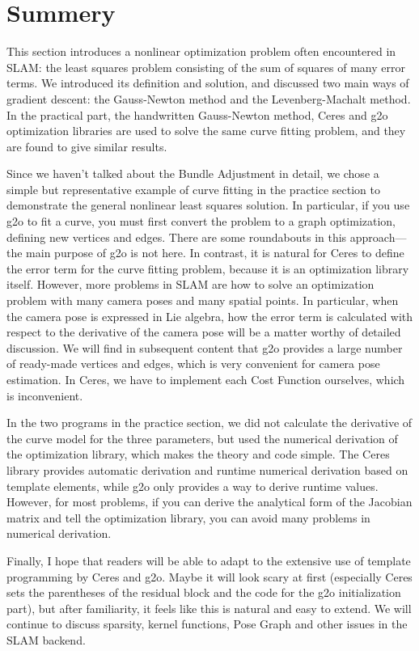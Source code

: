 \section{Summery}

This section introduces a nonlinear optimization problem often encountered in SLAM: the least squares problem consisting of the sum of squares of many error terms. We introduced its definition and solution, and discussed two main ways of gradient descent: the Gauss-Newton method and the Levenberg-Machalt method. In the practical part, the handwritten Gauss-Newton method, Ceres and g2o optimization libraries are used to solve the same curve fitting problem, and they are found to give similar results.

Since we haven't talked about the Bundle Adjustment in detail, we chose a simple but representative example of curve fitting in the practice section to demonstrate the general nonlinear least squares solution. In particular, if you use g2o to fit a curve, you must first convert the problem to a graph optimization, defining new vertices and edges. There are some roundabouts in this approach—the main purpose of g2o is not here. In contrast, it is natural for Ceres to define the error term for the curve fitting problem, because it is an optimization library itself. However, more problems in SLAM are how to solve an optimization problem with many camera poses and many spatial points. In particular, when the camera pose is expressed in Lie algebra, how the error term is calculated with respect to the derivative of the camera pose will be a matter worthy of detailed discussion. We will find in subsequent content that g2o provides a large number of ready-made vertices and edges, which is very convenient for camera pose estimation. In Ceres, we have to implement each Cost Function ourselves, which is inconvenient.

In the two programs in the practice section, we did not calculate the derivative of the curve model for the three parameters, but used the numerical derivation of the optimization library, which makes the theory and code simple. The Ceres library provides automatic derivation and runtime numerical derivation based on template elements, while g2o only provides a way to derive runtime values. However, for most problems, if you can derive the analytical form of the Jacobian matrix and tell the optimization library, you can avoid many problems in numerical derivation.

Finally, I hope that readers will be able to adapt to the extensive use of template programming by Ceres and g2o. Maybe it will look scary at first (especially Ceres sets the parentheses of the residual block and the code for the g2o initialization part), but after familiarity, it feels like this is natural and easy to extend. We will continue to discuss sparsity, kernel functions, Pose Graph and other issues in the SLAM backend.